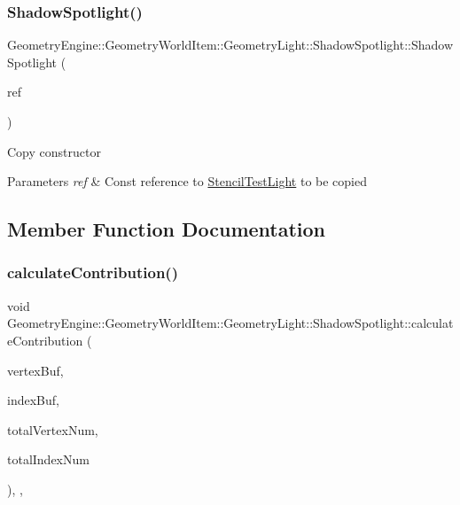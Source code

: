 \subsubsection{\texorpdfstring{ShadowSpotlight()}{ShadowSpotlight()}\hspace{0.1cm}{\footnotesize\ttfamily [2/2]}}
{\footnotesize\ttfamily Geometry\+Engine\+::\+Geometry\+World\+Item\+::\+Geometry\+Light\+::\+Shadow\+Spotlight\+::\+Shadow\+Spotlight (\begin{DoxyParamCaption}\item[{const \mbox{\hyperlink{class_geometry_engine_1_1_geometry_world_item_1_1_geometry_light_1_1_shadow_spotlight}{Shadow\+Spotlight}} \&}]{ref }\end{DoxyParamCaption})\hspace{0.3cm}{\ttfamily [inline]}}

Copy constructor 
\begin{DoxyParams}{Parameters}
{\em ref} & Const reference to \mbox{\hyperlink{class_geometry_engine_1_1_geometry_world_item_1_1_geometry_light_1_1_stencil_test_light}{Stencil\+Test\+Light}} to be copied \\
\hline
\end{DoxyParams}


\subsection{Member Function Documentation}
\mbox{\label{class_geometry_engine_1_1_geometry_world_item_1_1_geometry_light_1_1_shadow_spotlight_a27163f2f8903220d7eaae7aa70c9d6e6}} 
\subsubsection{\texorpdfstring{calculateContribution()}{calculateContribution()}}
{\footnotesize\ttfamily void Geometry\+Engine\+::\+Geometry\+World\+Item\+::\+Geometry\+Light\+::\+Shadow\+Spotlight\+::calculate\+Contribution (\begin{DoxyParamCaption}\item[{Q\+Open\+G\+L\+Buffer $\ast$}]{vertex\+Buf,  }\item[{Q\+Open\+G\+L\+Buffer $\ast$}]{index\+Buf,  }\item[{unsigned int}]{total\+Vertex\+Num,  }\item[{unsigned int}]{total\+Index\+Num }\end{DoxyParamCaption})\hspace{0.3cm}{\ttfamily [override]}, {\ttfamily [protected]}, {\ttfamily [virtual]}}

